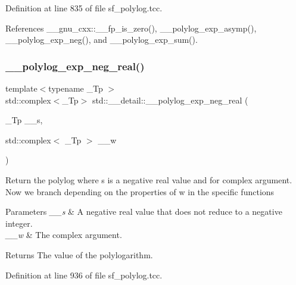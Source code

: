 Definition at line 835 of file sf\+\_\+polylog.\+tcc.



References \+\_\+\+\_\+gnu\+\_\+cxx\+::\+\_\+\+\_\+fp\+\_\+is\+\_\+zero(), \+\_\+\+\_\+polylog\+\_\+exp\+\_\+asymp(), \+\_\+\+\_\+polylog\+\_\+exp\+\_\+neg(), and \+\_\+\+\_\+polylog\+\_\+exp\+\_\+sum().

\mbox{\label{namespacestd_1_1____detail_a6320926219e1a9a653d9a793c7a3ad37}} 
\subsubsection{\texorpdfstring{\+\_\+\+\_\+polylog\+\_\+exp\+\_\+neg\+\_\+real()}{\_\_polylog\_exp\_neg\_real()}\hspace{0.1cm}{\footnotesize\ttfamily [1/2]}}
{\footnotesize\ttfamily template$<$typename \+\_\+\+Tp $>$ \\
std\+::complex$<$\+\_\+\+Tp$>$ std\+::\+\_\+\+\_\+detail\+::\+\_\+\+\_\+polylog\+\_\+exp\+\_\+neg\+\_\+real (\begin{DoxyParamCaption}\item[{\+\_\+\+Tp}]{\+\_\+\+\_\+s,  }\item[{std\+::complex$<$ \+\_\+\+Tp $>$}]{\+\_\+\+\_\+w }\end{DoxyParamCaption})}

Return the polylog where s is a negative real value and for complex argument. Now we branch depending on the properties of w in the specific functions


\begin{DoxyParams}{Parameters}
{\em \+\_\+\+\_\+s} & A negative real value that does not reduce to a negative integer. \\
\hline
{\em \+\_\+\+\_\+w} & The complex argument. \\
\hline
\end{DoxyParams}
\begin{DoxyReturn}{Returns}
The value of the polylogarithm. 
\end{DoxyReturn}


Definition at line 936 of file sf\+\_\+polylog.\+tcc.



